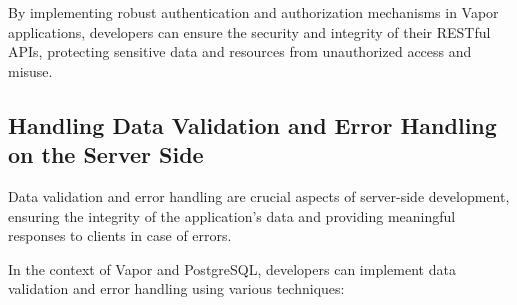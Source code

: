 \documentclass[
  biblatex,
  language=english,
  figures=false,
  sourcecodes,
  glossaries,
  index
]{kidiplom}
\begin{document}
By implementing robust authentication and authorization mechanisms in Vapor applications, developers can ensure the security and integrity of their RESTful APIs, protecting sensitive data and resources from unauthorized access and misuse.

\subsection{Handling Data Validation and Error Handling on the Server Side}

Data validation and error handling are crucial aspects of server-side development, ensuring the integrity of the application's data and providing meaningful responses to clients in case of errors.

In the context of Vapor and PostgreSQL, developers can implement data validation and error handling using various techniques:
\end{document}
